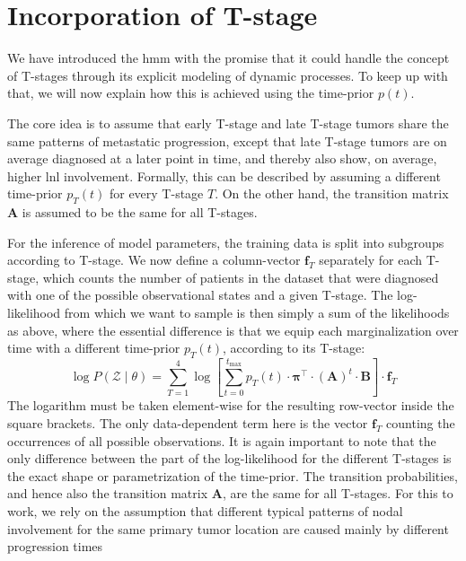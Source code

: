 \documentclass[\relativeRoot/main.tex]{subfiles}
\begin{document}
\section{Incorporation of T-stage}
\label{sec:unilateral:tstage}

We have introduced the \gls{hmm} with the promise that it could handle the concept of T-stages through its explicit modeling of dynamic processes. To keep up with that, we will now explain how this is achieved using the time-prior $p(t)$.

The core idea is to assume that early T-stage and late T-stage tumors share the same patterns of metastatic progression, except that late T-stage tumors are on average diagnosed at a later point in time, and thereby also show, on average, higher \gls{lnl} involvement. Formally, this can be described by assuming a different time-prior $p_T (t)$ for every T-stage $T$.  On the other hand, the transition matrix $\mathbf{A}$ is assumed to be the same for all T-stages.

For the inference of model parameters, the training data is split into subgroups according to T-stage. We now define a column-vector $\mathbf{f}_T$ separately for each T-stage, which counts the number of patients in the dataset that were diagnosed with one of the possible observational states and a given T-stage. The log-likelihood from which we want to sample is then simply a sum of the likelihoods as above, where the essential difference is that we equip each marginalization over time with a different time-prior $p_T (t)$, according to its T-stage:
%
\begin{equation} \label{eq:hmm_log_likelihood}
    \log{P \left( \boldsymbol{\mathcal{Z}} \mid \theta \right)} = \sum_{T=1}^{4}{\log{\left[ \sum_{t = 0}^{t_\text{max}}{p_T (t) \cdot \boldsymbol{\pi}^\top \cdot (\mathbf{A})^t \cdot \mathbf{B}} \right]} \cdot \mathbf{f}_T}
\end{equation}
%
The logarithm must be taken element-wise for the resulting row-vector inside the square brackets. The only data-dependent term here is the vector $\mathbf{f}_T$ counting the occurrences of all possible observations. It is again important to note that the only difference between the part of the log-likelihood for the different T-stages is the exact shape or parametrization of the time-prior. The transition probabilities, and hence also the transition matrix $\mathbf{A}$, are the same for all T-stages. For this to work, we rely on the assumption that different typical patterns of nodal involvement for the same primary tumor location are caused mainly by different progression times
\end{document}
